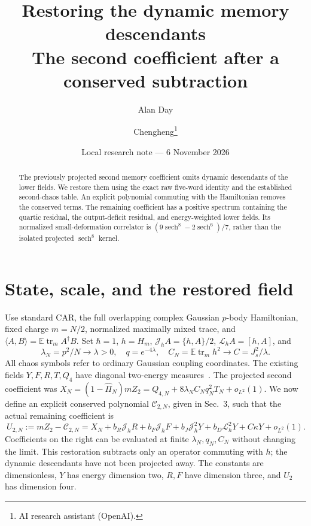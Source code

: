 \documentclass[11pt,a4paper]{article}
\title{Restoring the dynamic memory descendants\\The second coefficient after a conserved subtraction}
\author{Alan Day \and Chengheng\thanks{AI research assistant (OpenAI).}}
\date{Local research note --- 6 November 2026}
\newcommand{\EE}{\mathbb E}
\newcommand{\tr}{\operatorname{tr}}
\newcommand{\J}{J_s}
\newcommand{\Jh}{\mathcal J_h}
\newcommand{\Lh}{\mathcal L_h}
\DeclareMathOperator{\sech}{sech}
\begin{document}
\maketitle
\begin{abstract}
The previously projected second memory coefficient omits dynamic
descendants of the lower fields. We restore them using the exact
raw five-word identity and the established second-chaos table.
An explicit polynomial commuting with the Hamiltonian removes the
conserved terms. The remaining coefficient has a positive spectrum
containing the quartic residual, the output-deficit residual, and
energy-weighted lower fields. Its normalized small-deformation
correlator is $(9\sech^8-2\sech^6)/7$, rather than the isolated
projected $\sech^8$ kernel.
\end{abstract}
\section{State, scale, and the restored field}
Use standard CAR, the full overlapping complex Gaussian $p$-body
Hamiltonian, fixed charge $m=N/2$, normalized maximally mixed trace,
and $\langle A,B\rangle=\EE\tr_mA^\dagger B$. Set $\hbar=1$,
$h=H_m$, $\Jh A=\{h,A\}/2$, $\Lh A=[h,A]$, and
\begin{equation}
 \lambda_N=p^2/N\to\lambda>0,\quad q=e^{-4\lambda},\quad
 C_N=\EE\tr_mh^2\to C=\J^2/\lambda.
\end{equation}
All chaos symbols refer to ordinary Gaussian coupling coordinates.
The existing fields $Y,F,R,T,Q_4$ have diagonal two-energy
measures~\cite{mixed}. The projected second coefficient was
$X_N=(1-\widehat\Pi_N)mZ_2=Q_{4,N}+8\lambda_NC_Nq_N^2T_N+o_{L^2}(1)$.
We now define an explicit conserved polynomial $\mathcal C_{2,N}$,
given in Sec.~3, such that the actual remaining coefficient is
\begin{equation}
 \boxed{\ U_{2,N}:=mZ_2-\mathcal C_{2,N}
 =X_N+b_R\Jh R+b_F\Jh F+b_J\Jh^2Y+b_D\Lh^2Y+C\kappa Y
 +o_{L^2}(1).\ } \label{result}
\end{equation}
Coefficients on the right can be evaluated at finite
$\lambda_N,q_N,C_N$ without changing the limit. This restoration
subtracts only an operator commuting with $h$; the dynamic
descendants have not been projected away. The constants are
dimensionless, $Y$ has energy dimension two, $R,F$ have dimension
three, and $U_2$ has dimension four.

\newpage
\end{document}
